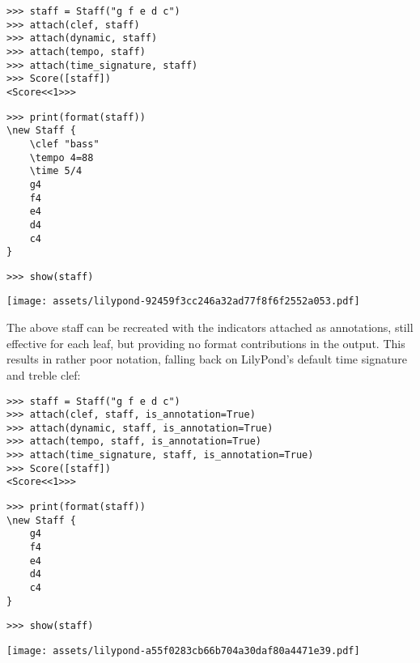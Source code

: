 \begin{comment}
<abjad>
staff = Staff("g f e d c")
attach(clef, staff)
attach(dynamic, staff)
attach(tempo, staff)
attach(time_signature, staff)
Score([staff])
print(format(staff))
show(staff)
</abjad>
\end{comment}

\begin{abjadbookoutput}
\begin{singlespacing}
\vspace{-0.5\baselineskip}
\begin{verbatim}
>>> staff = Staff("g f e d c")
>>> attach(clef, staff)
>>> attach(dynamic, staff)
>>> attach(tempo, staff)
>>> attach(time_signature, staff)
>>> Score([staff])
<Score<<1>>>
\end{verbatim}
\begin{verbatim}
>>> print(format(staff))
\new Staff {
    \clef "bass"
    \tempo 4=88
    \time 5/4
    g4
    f4
    e4
    d4
    c4
}
\end{verbatim}
\begin{verbatim}
>>> show(staff)
\end{verbatim}
\noindent\texttt{[image: assets/lilypond-92459f3cc246a32ad77f8f6f2552a053.pdf]}
\end{singlespacing}
\end{abjadbookoutput}

\noindent The above staff can be recreated with the indicators attached as
annotations, still effective for each leaf, but providing no format
contributions in the output. This results in rather poor notation, falling back
on LilyPond's default  time signature and treble clef:

\begin{comment}
<abjad>
staff = Staff("g f e d c")
attach(clef, staff, is_annotation=True)
attach(dynamic, staff, is_annotation=True)
attach(tempo, staff, is_annotation=True)
attach(time_signature, staff, is_annotation=True)
Score([staff])
print(format(staff))
show(staff)
</abjad>
\end{comment}

\begin{abjadbookoutput}
\begin{singlespacing}
\vspace{-0.5\baselineskip}
\begin{verbatim}
>>> staff = Staff("g f e d c")
>>> attach(clef, staff, is_annotation=True)
>>> attach(dynamic, staff, is_annotation=True)
>>> attach(tempo, staff, is_annotation=True)
>>> attach(time_signature, staff, is_annotation=True)
>>> Score([staff])
<Score<<1>>>
\end{verbatim}
\begin{verbatim}
>>> print(format(staff))
\new Staff {
    g4
    f4
    e4
    d4
    c4
}
\end{verbatim}
\begin{verbatim}
>>> show(staff)
\end{verbatim}
\noindent\texttt{[image: assets/lilypond-a55f0283cb66b704a30daf80a4471e39.pdf]}
\end{singlespacing}
\end{abjadbookoutput}

